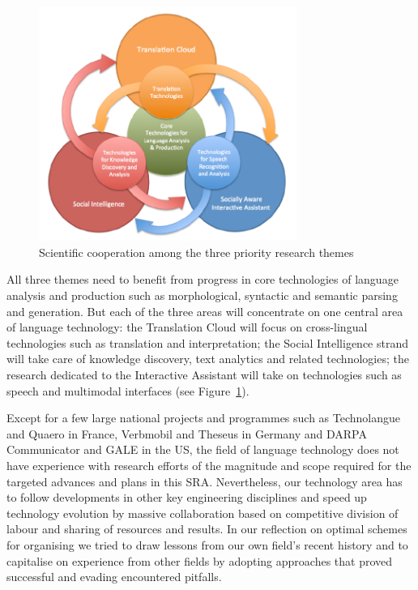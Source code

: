 \documentclass[10pt, plain]{../../metanetpaper}
\begin{document}
\begin{multicols}{2}
\begin{figure}[htb]
  \center
  \includegraphics[width=0.75\textwidth]{../_media/PT-Rings}
  \caption{Scientific cooperation among the three priority research themes}
  \label{fig:priority-themes}
\end{figure}
 
All three themes need to benefit from progress in core technologies of language analysis and production such as morphological, syntactic and semantic parsing and generation. But each of the three areas will concentrate on one central area of language technology: the Translation Cloud will focus on cross-lingual technologies such as translation and interpretation; the Social Intelligence strand will take care of knowledge discovery, text analytics and related technologies; the research dedicated to the Interactive Assistant will take on technologies such as speech and multimodal interfaces (see Figure~\ref{fig:priority-themes}).

Except for a few large national projects and programmes such as Technolangue and Quaero in France, Verbmobil and Theseus in Germany and DARPA Communicator and GALE in the US, the field of language technology does not have experience with research efforts of the magnitude and scope required for the targeted advances and plans in this SRA. Nevertheless, our technology area has to follow developments in other key engineering disciplines and speed up technology evolution by massive collaboration based on competitive division of labour and sharing of resources and results. In our reflection on optimal schemes for organising we tried to draw lessons from our own field's recent history and to capitalise on experience from other fields by adopting approaches that proved successful and evading encountered pitfalls.
 

\end{multicols}
\end{document}
